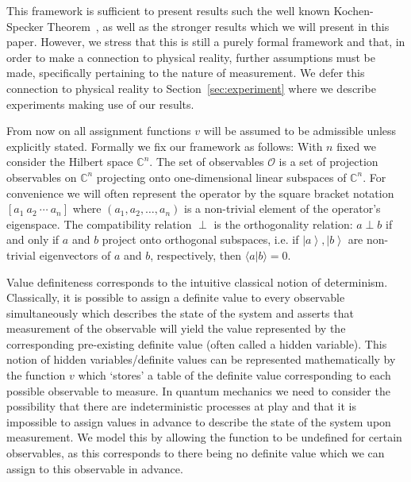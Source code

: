 \documentclass[11pt, a4paper]{article}
\theoremstyle{definition}
\newcommand{\ket}[1]{\left| #1 \right>}
\newcommand{\iprod}[2]{\langle #1 | #2 \rangle}
\begin{document}
This framework is sufficient to present results such the well known Kochen-Specker Theorem~\cite{kochen1}, as well as the stronger results which we will present in this paper.
However, we stress that this is still a purely formal framework and that, in order to make a connection to physical reality, further assumptions must be made, specifically pertaining to the nature of measurement.
We defer this connection to physical reality to Section~\ref{sec:experiment} where we describe experiments making use of our results.
	
From now on all assignment functions $v$ will be assumed to be admissible unless explicitly stated.
Formally we fix our framework as follows:
With $n$ fixed we consider the Hilbert space $\mathbb{C}^n$. The set of observables $\mathcal{O}$ is a set of projection observables on $\mathbb{C}^n$ projecting onto one-dimensional linear subspaces of $\mathbb{C}^n$.
For convenience we will often represent the operator by the square bracket notation $[a_1~a_2~\cdots~a_n]$ where $(a_1,a_2,\dots,a_n)$ is a non-trivial element of the operator's eigenspace.
The compatibility relation $\perp$ is the orthogonality relation: $a\perp b$ if and only if $a$ and $b$ project onto orthogonal subspaces, i.e. if $\ket{a},\ket{b}$ are non-trivial eigenvectors of $a$ and $b$, respectively, then $\iprod{a}{b}=0$.

Value definiteness corresponds to the intuitive classical notion of determinism.
Classically, it is possible to assign a definite value to every observable simultaneously which describes the state of the system and asserts that measurement of the observable will yield the value represented by the corresponding pre-existing definite value (often called a hidden variable).
This notion of hidden variables/definite values can be represented mathematically by the function $v$ which `stores' a table of the definite value corresponding to each possible observable to measure.
In quantum mechanics we need to consider the possibility that there are indeterministic processes at play and that it is impossible to assign values in advance to describe the state of the system upon measurement.
We model this by allowing the function to be undefined for certain observables, as this corresponds to there being no definite value which we can assign to this observable in advance.
\fi
\end{document}
